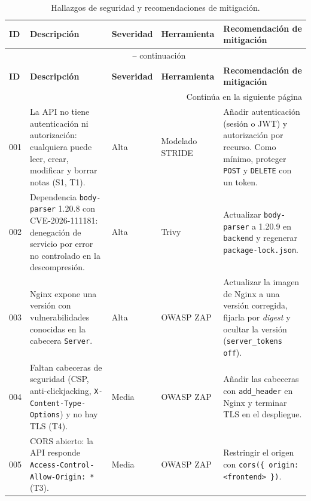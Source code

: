 \begin{longtable}{
    p{0.8cm}
    p{4.1cm}
    p{1.4cm}
    p{2.3cm}
    p{5.0cm}
}

\caption{Hallazgos de seguridad y recomendaciones de mitigación.}
\label{tab:hallazgos}\\

\toprule
\textbf{ID} &
\textbf{Descripción} &
\textbf{Severidad} &
\textbf{Herramienta} &
\textbf{Recomendación de mitigación} \\
\midrule
\endfirsthead

\multicolumn{5}{c}{
    \tablename\ \thetable{} -- continuación
}\\
\toprule
\textbf{ID} &
\textbf{Descripción} &
\textbf{Severidad} &
\textbf{Herramienta} &
\textbf{Recomendación de mitigación} \\
\midrule
\endhead

\midrule
\multicolumn{5}{r}{Continúa en la siguiente página}\\
\endfoot

\bottomrule
\endlastfoot

001 & La API no tiene autenticación ni autorización: cualquiera puede
leer, crear, modificar y borrar notas (S1, T1). &
Alta & Modelado STRIDE &
Añadir autenticación (sesión o JWT) y autorización por recurso. Como
mínimo, proteger \texttt{POST} y \texttt{DELETE} con un token. \\

002 & Dependencia \texttt{body-parser} 1.20.8 con CVE-2026-111181:
denegación de servicio por error no controlado en la descompresión. &
Alta & Trivy &
Actualizar \texttt{body-parser} a 1.20.9 en \texttt{backend} y regenerar
\texttt{package-lock.json}. \\

003 & Nginx expone una versión con vulnerabilidades conocidas en la
cabecera \texttt{Server}. &
Alta & OWASP ZAP &
Actualizar la imagen de Nginx a una versión corregida, fijarla por
\textit{digest} y ocultar la versión (\texttt{server\_tokens off}). \\

004 & Faltan cabeceras de seguridad (CSP, anti-clickjacking,
\texttt{X-Content-Type-Options}) y no hay TLS (T4). &
Media & OWASP ZAP &
Añadir las cabeceras con \texttt{add\_header} en Nginx y terminar TLS en el
despliegue. \\

005 & CORS abierto: la API responde
\texttt{Access-Control-Allow-Origin: *} (T3). &
Media & OWASP ZAP &
Restringir el origen con \texttt{cors(\{ origin: <frontend> \})}. \\


\end{longtable}
